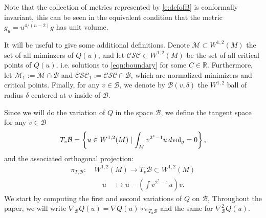\documentclass[12pt]{amsart}
\newcommand{\R}{{\mathbb{R}}}
\newcommand{\M}{{\mathcal{M}}}
\newcommand{\na}{{\nabla}}
\newcommand{\B}{\mathcal{B}}
\newcommand{\vol}{{\rm{vol}}}
\begin{document}
 Note that the collection of metrics represented by \eqref{e:defofB} is conformally invariant, this can be seen in the equivalent condition that the metric $g_u = u^{4/(n-2)}g$ has unit volume. 

 It will be useful to give some additional definitions. Denote $\mathcal{M} \subset W^{1,2}(M)$ the set of all miminzers of $Q(u)$, and let  $\mathcal{CSC} \subset W^{1,2}(M)$ be the set of all critical points of $Q(u)$,
 i.e. solutions to \eqref{eqn:boundary} for some $C \in \R$. 
 Furthermore, let $\M_1 := \M \cap \B$ and $\mathcal{CSC}_1:=\mathcal{CSC}\cap \B$, which are normalized minimizers and critical points. Finally, for any $v \in \B$, we denote by $\B(v,\delta)$ the $W^{1,2}$ ball of radius $\delta$ centered at $v$ inside of $\B$.

 Since we will do the variation of $Q$ in the space $\B$, we define the tangent space for any $v\in \B$
 \begin{equation}
     T_v \B = \left\{u \in W^{1,2}(M) \mid  \int_{M} v^{2^*-1} u \, d \vol_g =0\right\},
 \end{equation}
and the associated orthogonal projection:
\begin{align}
    \pi_{T_v\B} : ~& W^{1,2}(M) \to T_v\B\subset W^{1,2}(M)\\
    &~~~~~u~~~~~\mapsto  u - \left(\int v^{2^*-1} u\right)v .
\end{align}
We start by computing the first and second variations of $Q$ on $\B$, Throughout the paper, we will write $\na_\B Q(u) = \na Q(u) \circ \pi_{T_u \B}$ and the same for $\na ^2 _\B Q(u)$.
    
\end{document}
